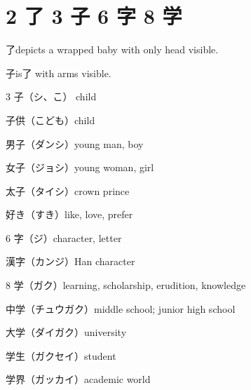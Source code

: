 \section{2 了 3 子 6 字 8 学}

了depicts a wrapped baby with only head visible.

子is了 with arms visible.

3 子（シ、こ） child

子供（こども）child

男子（ダンシ）young man, boy

女子（ジョシ）young woman, girl

太子（タイシ）crown prince

好き（すき）like, love, prefer

6 字（ジ）character, letter

漢字（カンジ）Han character

8 学（ガク）learning, scholarship, erudition, knowledge

中学（チュウガク）middle school; junior high school

大学（ダイガク）university

学生（ガクセイ）student

学界（ガッカイ）academic world
